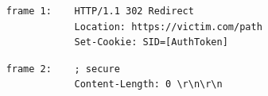 \begin{verbatim}
    frame 1:    HTTP/1.1 302 Redirect
                Location: https://victim.com/path
                Set-Cookie: SID=[AuthToken]
\end{verbatim}

\begin{verbatim}
    frame 2:    ; secure
                Content-Length: 0 \r\n\r\n
\end{verbatim}